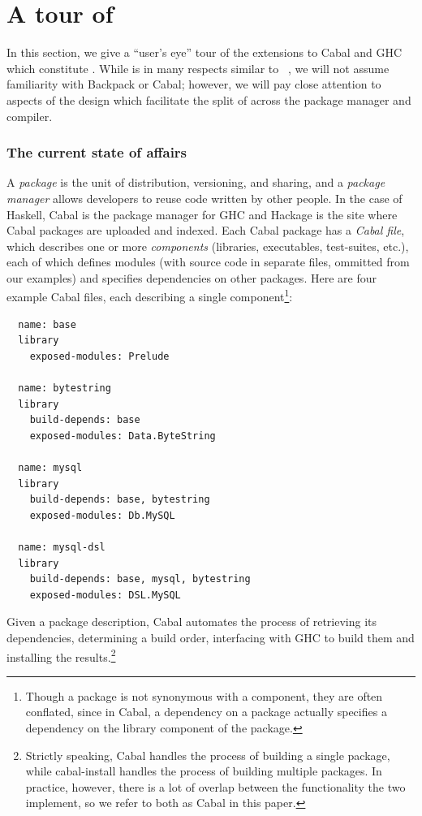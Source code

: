 \chapter{A tour of \Backpack{}}
\label{sec:tour}

In this section, we give a ``user's eye'' tour of the extensions to
Cabal and GHC which constitute \Backpack{}.  While \Backpack{} is in
many respects similar to \OldBackpack{}~\cite{backpack}, we will not assume
familiarity with Backpack or Cabal; however, we will pay close attention
to aspects of the design which facilitate the split of \Backpack{}
across the package manager and compiler.

\subsection{The current state of affairs}

A \emph{package} is the unit of distribution, versioning, and sharing,
and a \emph{package manager} allows developers to reuse code
written by other people.  In the case of Haskell, Cabal is the package manager for GHC
and Hackage is the site where Cabal packages are uploaded and indexed.
Each Cabal package has a \emph{Cabal file}, which describes
one or more \emph{components} (libraries, executables, test-suites, etc.), each of which
defines modules (with source code in separate files, ommitted from our examples) and specifies dependencies on other packages.  Here are four
example Cabal files, each describing a single component\footnote{
Though a package is not synonymous with a component, they are
often conflated, since in Cabal, a dependency on a package actually
specifies a dependency on the library component of the package.}:

\begin{verbatim}
  name: base
  library
    exposed-modules: Prelude

  name: bytestring
  library
    build-depends: base
    exposed-modules: Data.ByteString

  name: mysql
  library
    build-depends: base, bytestring
    exposed-modules: Db.MySQL

  name: mysql-dsl
  library
    build-depends: base, mysql, bytestring
    exposed-modules: DSL.MySQL
\end{verbatim}
%
Given a package description, Cabal automates the process of retrieving
its dependencies, determining a build order, interfacing with
GHC to build them and installing the results.\footnote{Strictly speaking,
Cabal handles the process of building a single package, while
cabal-install handles the process of building multiple packages.  In
practice, however, there is a lot of overlap between the functionality the two
implement, so we refer to both as Cabal in this paper.}

